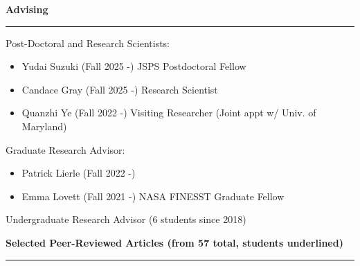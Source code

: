 \documentclass[12pt]{report}
\newcommand{\numitems}[1]{\getrefnumber{#1}}
\begin{document}
\vspace{2 mm}
\noindent \bf{Advising}\rm \hspace*{\fill} \\
\rule{\textwidth}{1pt}

\noindent Post-Doctoral and Research Scientists: 
\begin{itemize} \itemsep -2pt
	\item Yudai Suzuki (Fall 2025 -) JSPS Postdoctoral Fellow
	\item Candace Gray (Fall 2025 -) Research Scientist
	\item Quanzhi Ye (Fall 2022 -) Visiting Researcher (Joint appt w/ Univ. of Maryland)
\end{itemize}

\noindent Graduate Research Advisor: 
\begin{itemize} \itemsep -2pt
	\item Patrick Lierle (Fall 2022 -) 
	\item Emma Lovett (Fall 2021 -) NASA FINESST Graduate Fellow
\end{itemize}

\noindent Undergraduate Research Advisor (6 students since 2018)

\vspace{2 mm}
\noindent\textbf{Selected Peer-Reviewed Articles (from 57 total, students underlined)} \rm\hspace*{\fill} \\
\rule{\textwidth}{1pt}
\end{document}
